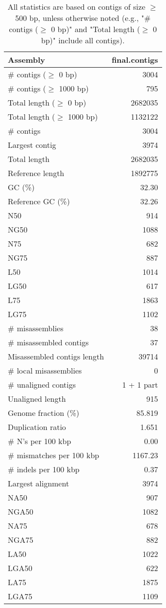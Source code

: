 \documentclass[12pt,a4paper]{article}
\begin{document}
\begin{table}[ht]
\begin{center}
\caption{All statistics are based on contigs of size $\geq$ 500 bp, unless otherwise noted (e.g., "\# contigs ($\geq$ 0 bp)" and "Total length ($\geq$ 0 bp)" include all contigs).}
\begin{tabular}{|l*{1}{|r}|}
\hline
Assembly & final.contigs \\ \hline
\# contigs ($\geq$ 0 bp) & 3004 \\ \hline
\# contigs ($\geq$ 1000 bp) & 795 \\ \hline
Total length ($\geq$ 0 bp) & 2682035 \\ \hline
Total length ($\geq$ 1000 bp) & 1132122 \\ \hline
\# contigs & 3004 \\ \hline
Largest contig & 3974 \\ \hline
Total length & 2682035 \\ \hline
Reference length & 1892775 \\ \hline
GC (\%) & 32.30 \\ \hline
Reference GC (\%) & 32.26 \\ \hline
N50 & 914 \\ \hline
NG50 & 1088 \\ \hline
N75 & 682 \\ \hline
NG75 & 887 \\ \hline
L50 & 1014 \\ \hline
LG50 & 617 \\ \hline
L75 & 1863 \\ \hline
LG75 & 1102 \\ \hline
\# misassemblies & 38 \\ \hline
\# misassembled contigs & 37 \\ \hline
Misassembled contigs length & 39714 \\ \hline
\# local misassemblies & 0 \\ \hline
\# unaligned contigs & 1 + 1 part \\ \hline
Unaligned length & 915 \\ \hline
Genome fraction (\%) & 85.819 \\ \hline
Duplication ratio & 1.651 \\ \hline
\# N's per 100 kbp & 0.00 \\ \hline
\# mismatches per 100 kbp & 1167.23 \\ \hline
\# indels per 100 kbp & 0.37 \\ \hline
Largest alignment & 3974 \\ \hline
NA50 & 907 \\ \hline
NGA50 & 1082 \\ \hline
NA75 & 678 \\ \hline
NGA75 & 882 \\ \hline
LA50 & 1022 \\ \hline
LGA50 & 622 \\ \hline
LA75 & 1875 \\ \hline
LGA75 & 1109 \\ \hline
\end{tabular}
\end{center}
\end{table}
\end{document}
